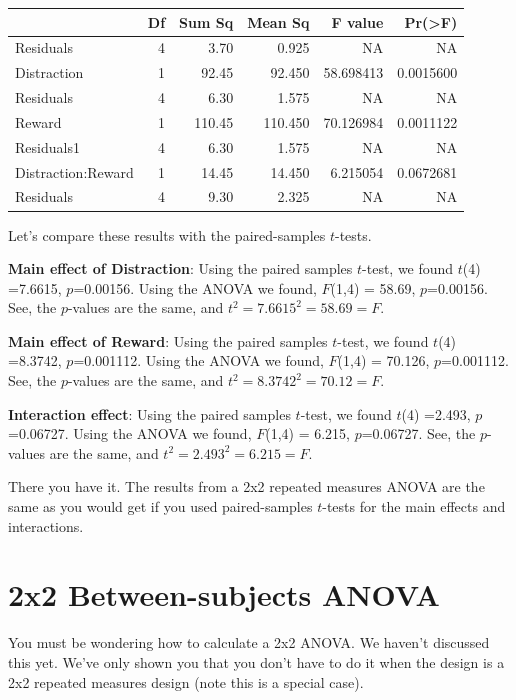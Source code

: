 \documentclass[
]{book}
\begin{document}
\begin{tabular}{l|r|r|r|r|r}
\hline
  & Df & Sum Sq & Mean Sq & F value & Pr(>F)\\
\hline
Residuals & 4 & 3.70 & 0.925 & NA & NA\\
\hline
Distraction & 1 & 92.45 & 92.450 & 58.698413 & 0.0015600\\
\hline
Residuals & 4 & 6.30 & 1.575 & NA & NA\\
\hline
Reward & 1 & 110.45 & 110.450 & 70.126984 & 0.0011122\\
\hline
Residuals1 & 4 & 6.30 & 1.575 & NA & NA\\
\hline
Distraction:Reward & 1 & 14.45 & 14.450 & 6.215054 & 0.0672681\\
\hline
Residuals & 4 & 9.30 & 2.325 & NA & NA\\
\hline
\end{tabular}

Let's compare these results with the paired-samples \(t\)-tests.

\textbf{Main effect of Distraction}: Using the paired samples \(t\)-test, we found \(t\)(4) =7.6615, \(p\)=0.00156. Using the ANOVA we found, \(F\)(1,4) = 58.69, \(p\)=0.00156. See, the \(p\)-values are the same, and \(t^2 = 7.6615^2 = 58.69 = F\).

\textbf{Main effect of Reward}: Using the paired samples \(t\)-test, we found \(t\)(4) =8.3742, \(p\)=0.001112. Using the ANOVA we found, \(F\)(1,4) = 70.126, \(p\)=0.001112. See, the \(p\)-values are the same, and \(t^2 = 8.3742^2 = 70.12 = F\).

\textbf{Interaction effect}: Using the paired samples \(t\)-test, we found \(t\)(4) =2.493, \(p\)=0.06727. Using the ANOVA we found, \(F\)(1,4) = 6.215, \(p\)=0.06727. See, the \(p\)-values are the same, and \(t^2 = 2.493^2 = 6.215 = F\).

There you have it. The results from a 2x2 repeated measures ANOVA are the same as you would get if you used paired-samples \(t\)-tests for the main effects and interactions.

\section{2x2 Between-subjects ANOVA}\label{x2-between-subjects-anova}

You must be wondering how to calculate a 2x2 ANOVA. We haven't discussed this yet. We've only shown you that you don't have to do it when the design is a 2x2 repeated measures design (note this is a special case).
\end{document}
